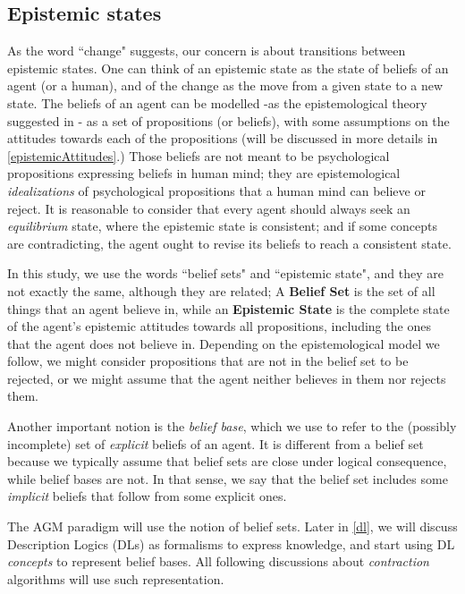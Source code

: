 \subsection{Epistemic states}
As the word ``change" suggests, our concern is about transitions between epistemic states. One can think of an epistemic state as the state of beliefs of an agent (or a human), and of the change as the move from a given state to a new state. The beliefs of an agent can be modelled -as the epistemological theory suggested in \cite{flux}- as a set of propositions (or beliefs), with some assumptions on the attitudes towards each of the propositions (will be discussed in more details in \ref{epistemicAttitudes}.) Those beliefs are not meant to be psychological propositions expressing beliefs in human mind; they are epistemological \textit{idealizations} of psychological propositions that a human mind can believe or reject. It is reasonable to consider that every agent should always seek an \textit{equilibrium} state, where the epistemic state is consistent; and if some concepts are contradicting, the agent ought to revise its beliefs to reach a consistent state. 

In this study, we use the words ``belief sets" and ``epistemic state", and they are not exactly the same, although they are related; A \textbf{Belief Set} is the set of all things that an agent believe in, while an \textbf{Epistemic State} is the complete state of the agent's epistemic attitudes towards all propositions, including the ones that the agent does not believe in. Depending on the epistemological model we follow, we might consider propositions that are not in the belief set to be rejected, or we might assume that the agent neither believes in them nor rejects them. 

Another important notion is the \textit{belief base}, which we use to refer to the (possibly incomplete) set of \textit{explicit} beliefs of an agent. It is different from a belief set because we typically assume that belief sets are close under logical consequence, while belief bases are not. In that sense, we say that the belief set includes some \textit{implicit} beliefs that follow from some explicit ones.

The AGM paradigm will use the notion of belief sets. Later in \ref{dl}, we will discuss Description Logics (DLs) as formalisms to express knowledge, and start using DL \textit{concepts} to represent belief bases. All following discussions about \textit{contraction} algorithms will use such representation.



